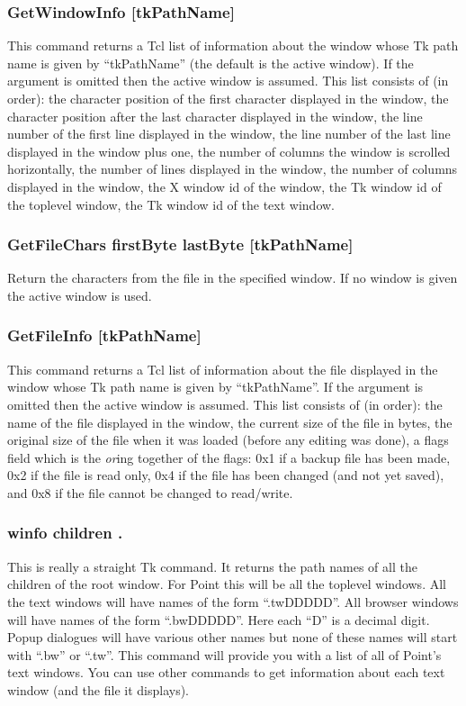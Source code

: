 \subsubsection{GetWindowInfo [tkPathName]}
This command returns a Tcl list of information about the
window whose Tk path name is given by ``tkPathName''
(the default is the active window).
If the argument is omitted then the active window is assumed.
This list consists of (in order):
the character position of the first character displayed in the window,
the character position after the last character displayed in the window,
the line number of the first line displayed in the window,
the line number of the last line displayed in the window plus one,
the number of columns the window is scrolled horizontally,
the number of lines displayed in the window,
the number of columns displayed in the window,
the X window id of the window,
the Tk window id of the toplevel window,
the Tk window id of the text window.

\subsubsection{GetFileChars firstByte lastByte [tkPathName]}
Return the characters from the file in the specified window.
If no window is given the active window is used.

\subsubsection{GetFileInfo [tkPathName]}
This command returns a Tcl list of information about the
file displayed in the window whose Tk path name is given by ``tkPathName''.
If the argument is omitted then the active window is assumed.
This list consists of (in order):
the name of the file displayed in the window,
the current size of the file in bytes,
the original size of the file when it was loaded
(before any editing was done),
a flags field which is the {\it or}ing together
of the flags:
0x1 if a backup file has been made,
0x2 if the file is read only,
0x4 if the file has been changed (and not yet saved),
and 0x8 if the file cannot be changed to read/write.

\subsubsection{winfo children .}
This is really a straight Tk command.
It returns the path names of all the children of the root window.
For Point this will be all the toplevel windows.
All the text windows will have names of the form ``.twDDDDD''.
All browser windows will have names of the form ``.bwDDDDD''.
Here each ``D'' is a decimal digit.
Popup dialogues will have various other names
but none of these names will start with ``.bw'' or ``.tw''.
This command will provide you with a list of all of Point's
text windows.
You can use other commands to get information about each
text window (and the file it displays).




